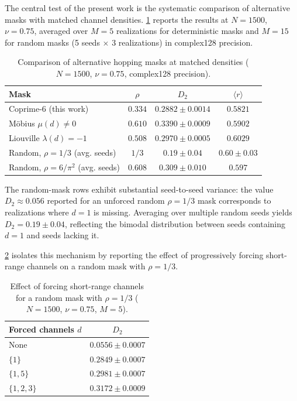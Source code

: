 \documentclass[11pt,a4paper]{article}
\begin{document}
The central test of the present work is the systematic comparison of alternative masks with matched channel densities. \cref{tab:alternative_masks} reports the results at $N = 1500$, $\nu = 0.75$, averaged over $M = 5$ realizations for deterministic masks and $M=15$ for random masks (5 seeds $\times$ 3 realizations) in complex128 precision.

\begin{table}[htbp]
\centering
\caption{Comparison of alternative hopping masks at matched densities ($N=1500$, $\nu=0.75$, complex128 precision).}
\label{tab:alternative_masks}
\begin{tabular}{l c c c}
\toprule
\textbf{Mask} & $\rho$ & $D_2$ & $\langle r \rangle$ \\
\midrule
Coprime-6 (this work)            & $0.334$ & $0.2882 \pm 0.0014$ & $0.5821$ \\
Möbius $\mu(d) \neq 0$           & $0.610$ & $0.3390 \pm 0.0009$ & $0.5902$ \\
Liouville $\lambda(d) = -1$      & $0.508$ & $0.2970 \pm 0.0005$ & $0.6029$ \\
Random, $\rho = 1/3$ (avg. seeds) & $1/3$ & $0.19 \pm 0.04$ & $0.60 \pm 0.03$ \\
Random, $\rho = 6/\pi^2$ (avg. seeds) & $0.608$ & $0.309 \pm 0.010$ & $0.597$ \\
\bottomrule
\end{tabular}
\end{table}

The random-mask rows exhibit substantial seed-to-seed variance: the value $D_2 \approx 0.056$ reported for an unforced random $\rho = 1/3$ mask corresponds to realizations where $d=1$ is missing. Averaging over multiple random seeds yields $D_2 = 0.19 \pm 0.04$, reflecting the bimodal distribution between seeds containing $d=1$ and seeds lacking it.

\cref{tab:forced_channels} isolates this mechanism by reporting the effect of progressively forcing short-range channels on a random mask with $\rho = 1/3$.

\begin{table}[htbp]
\centering
\caption{Effect of forcing short-range channels for a random mask with $\rho=1/3$ ($N=1500$, $\nu=0.75$, $M=5$).}
\label{tab:forced_channels}
\begin{tabular}{l c}
\toprule
\textbf{Forced channels $d$} & $D_2$ \\
\midrule
None                              & $0.0556 \pm 0.0007$ \\
$\{1\}$                           & $0.2849 \pm 0.0007$ \\
$\{1, 5\}$                        & $0.2981 \pm 0.0007$ \\
$\{1, 2, 3\}$                     & $0.3172 \pm 0.0009$ \\
\bottomrule
\end{tabular}
\end{table}
\end{document}
